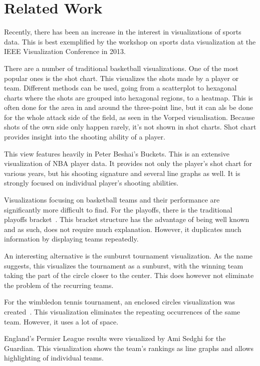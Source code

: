 \documentclass[]{sigchi}
\begin{document}
\section{Related Work}\label{sec:literature}
Recently, there has been an increase in the interest in visualizations of sports
data. This is best exemplified by the workshop on sports data visualization at
the IEEE Visualization Conference in 2013\cite{ieeevis}. 

There are a number of traditional basketball visualizations. One of the most
popular ones is the shot chart. This visualizes the shots made by a player or team. Different methods can be used, going from a scatterplot to hexagonal charts where the shots are grouped into hexagonal regions, to a heatmap. This is often done for the area in and around the three-point line, but it can als be done for the whole attack side of the field, as seen in the Vorped visualisation\cite{vorped}. Because shots of the own side only happen rarely, it's not shown in shot charts. Shot chart provides insight into the shooting ability of a
player\cite{goldsberry,stephenchu}.

This view features heavily in Peter Beshai's Buckets\cite{peterbeshai}. This is
an extensive visualization of NBA player data. It provides not only the player's
shot chart for various years, but his shooting signature and several line graphs
as well. It is strongly focused on individual player's shooting abilities. 

Visualizations focusing on basketball teams and their performance are
significantly more difficult to find. For the playoffs, there is the traditional
playoffs bracket~\cite{tournamentladder}. This bracket structure has the
advantage of being well known and as such, does not require much explanation. 
However, it duplicates much information by displaying teams repeatedly. 

An interesting alternative is the sunburst tournament
visualization\cite{sunburst}. As the name suggests, this visualizes the
tournament as a sunburst, with the winning team taking the part of the circle
closer to the center. This does however not eliminate the problem of the recurring teams.

For the wimbledon tennis tournament, an enclosed circles visualization was
created~\cite{enclosedcircles}. This visualization eliminates the repeating
occurrences of the same team. However, it uses a lot of space. 

England's Permier League results were visualized by Ami Sedghi for the
Guardian\cite{premierleague}. This visualization shows the team's rankings as
line graphs and allows highlighting of individual teams.
\end{document}

